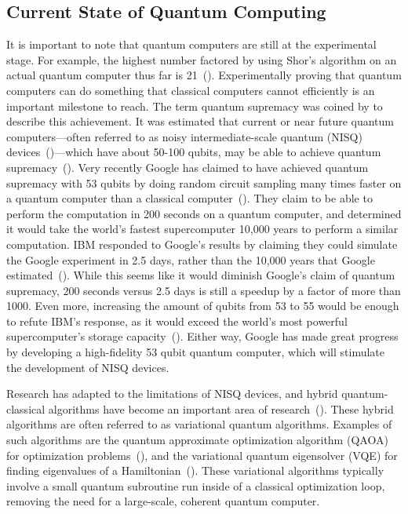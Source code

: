 \documentclass[a4paper,10pt]{article}
\begin{document}
\subsection{Current State of Quantum Computing}
It is important to note that quantum computers are still at the experimental stage.
For example, the highest number factored by using Shor's algorithm on an actual quantum computer thus far is 21~(\cite{shor-21}).
Experimentally proving that quantum computers can do something that classical computers cannot efficiently is an important milestone to reach.
The term quantum supremacy was coined by \textcite{preskill-qc} to describe this achievement.
It was estimated that current or near future quantum computers---often referred to as noisy intermediate-scale quantum (NISQ) devices~(\cite{preskill-nisq})---which have about 50-100 qubits, may be able to achieve quantum supremacy~(\cite{boixo2018characterizing}).
Very recently Google has claimed to have achieved quantum supremacy with 53 qubits by doing random circuit sampling many times faster on a quantum computer than a classical computer~(\cite{arute2019quantum}).
They claim to be able to perform the computation in 200 seconds on a quantum computer, and determined it would take the world's fastest supercomputer 10,000 years to perform a similar computation.
IBM responded to Google's results by claiming they could simulate the Google experiment in 2.5 days, rather than the 10,000 years that Google estimated~(\cite{pednault2019leveraging}).
While this seems like it would diminish Google's claim of quantum supremacy, 200 seconds versus 2.5 days is still a speedup by a factor of more than 1000.
Even more, increasing the amount of qubits from 53 to 55 would be enough to refute IBM's response, as it would exceed the world's most powerful supercomputer's storage capacity~(\cite{aaronson2019supremacy}).
Either way, Google has made great progress by developing a high-fidelity 53 qubit quantum computer, which will stimulate the development of NISQ devices.

Research has adapted to the limitations of NISQ devices, and hybrid quantum-classical algorithms have become an important area of research~(\cite{mcclean2016theory, guerreschi2017practical}).
These hybrid algorithms are often referred to as variational quantum algorithms.
Examples of such algorithms are the quantum approximate optimization algorithm (QAOA) for optimization problems~(\cite{qaoa}), and the variational quantum eigensolver (VQE) for finding eigenvalues of a Hamiltonian~(\cite{vqe}).
These variational algorithms typically involve a small quantum subroutine run inside of a classical optimization loop, removing the need for a large-scale, coherent quantum computer.
\end{document}
